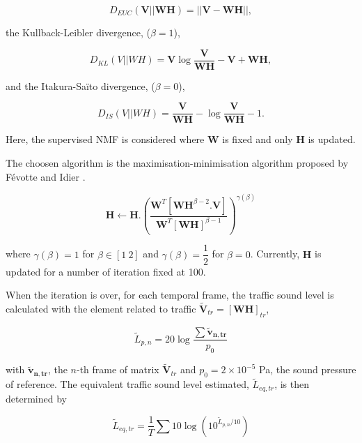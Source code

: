 \documentclass{article}
\begin{document}
\begin{sloppy}
\begin{equation}\label{eq:distEUC}
D_{EUC}(\mathbf{V} \vert \vert \mathbf{WH}) =  \vert\vert \mathbf{V} - \mathbf{WH} \vert\vert , 
\end{equation} 

the Kullback-Leibler divergence, ($\beta = 1$), 

\begin{equation}\label{eq:divKL}
D_{KL}(V\vert\vert WH) = \mathbf{V}\log\frac{\mathbf{V}}{\mathbf{WH}}-\mathbf{V}+\mathbf{WH},
\end{equation}

and the Itakura-Saïto divergence, ($\beta = 0$), 
 
\begin{equation}\label{eq:divIS}
D_{IS}(V\vert\vert WH) = \frac{\mathbf{V}}{\mathbf{WH}} -\log\frac{\mathbf{V}}{\mathbf{WH}}-1.
\end{equation}

Here, the supervised NMF is considered where $\mathbf{W}$ is fixed and only $\mathbf{H}$ is updated.

The choosen algorithm is the maximisation-minimisation algorithm proposed by F\'{e}votte and Idier \cite{fevotte2011}.

\begin{equation}
\mathbf{H} \longleftarrow \mathbf{H}.\left(\frac{\mathbf{W}^T\left[\mathbf{WH}^{\beta-2}.\mathbf{V} \right]}{\mathbf{W}^T \left[ \mathbf{WH} \right]^{\beta-1}}\right)^{\gamma(\beta)}
\end{equation}

where $\gamma(\beta) = 1$ for $\beta \in [1~2]$ and $\gamma(\beta) = \dfrac{1}{2}$ for $\beta = 0$. Currently, $\mathbf{H}$ is updated for a number of iteration fixed at 100.

When the iteration is over, for each temporal frame, the traffic sound level is calculated with the element related to traffic $\mathbf{\tilde{V}}_{tr} = \left[\mathbf{WH}\right]_{tr}$,

\begin{equation}\label{eq:Lp}
\tilde{L}_{p,n} = 20\log\frac{\sum\mathbf{\mathbf{\tilde{v}}_{\mathbf{n},tr}}}{p_{0}}
\end{equation}

with $\mathbf{\tilde{v}_{n,tr}}$, the $n$-th frame of matrix $\mathbf{\tilde{V}}_{tr}$ and $ p_{0} = 2\times 10^{-5}$ Pa, the sound pressure of reference. The equivalent traffic sound level estimated, $\tilde{L}_{eq,tr}$, is then determined by

\begin{equation}\label{eq:Leq}
\tilde{L}_{eq,tr} = \frac{1}{T} \sum 10\log \left(10^{\tilde{L}_{p,n}/10}\right)
\end{equation}


\end{sloppy}
\end{document}
